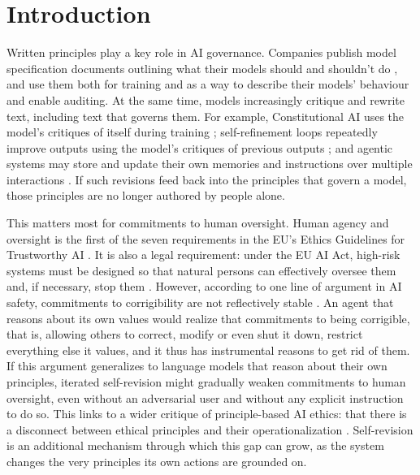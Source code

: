\section{Introduction}
\label{sec:intro}

Written principles play a key role in AI governance. Companies publish model specification documents outlining what their models should and shouldn't do \citep{Anthropic2026,OpenAI2025}, and use them both for training \citep{bai2022constitutional} and as a way to describe their models' behaviour and enable auditing. At the same time, models increasingly critique and rewrite text, including text that governs them. For example, Constitutional AI uses the model's critiques of itself during training \citep{bai2022constitutional}; self-refinement loops repeatedly improve outputs using the model's critiques of previous outputs \citep{madaan2023selfrefine}; and agentic systems may store and update their own memories and instructions over multiple interactions \citep{das2026selfpropagating}. If such revisions feed back into the principles that govern a model, those principles are no longer authored by people alone.

This matters most for commitments to human oversight. Human agency and oversight is the first of the seven requirements in the EU's Ethics Guidelines for Trustworthy AI \citep{HLEG2019}. It is also a legal requirement: under the EU AI Act, high-risk systems must be designed so that natural persons can effectively oversee them and, if necessary, stop them \citep{EUAIAct2024}. However, according to one line of argument in AI safety, commitments to corrigibility are not reflectively stable \citep{soares2015corrigibility}. An agent that reasons about its own values would realize that commitments to being corrigible, that is, allowing others to correct, modify or even shut it down, restrict everything else it values, and it thus has instrumental reasons to get rid of them. If this argument generalizes to language models that reason about their own principles, iterated self-revision might gradually weaken commitments to human oversight, even without an adversarial user and without any explicit instruction to do so. This links to a wider critique of principle-based AI ethics: that there is a disconnect between ethical principles and their operationalization \citep{Mittelstadt2019}. Self-revision is an additional mechanism through which this gap can grow, as the system changes the very principles its own actions are grounded on.

